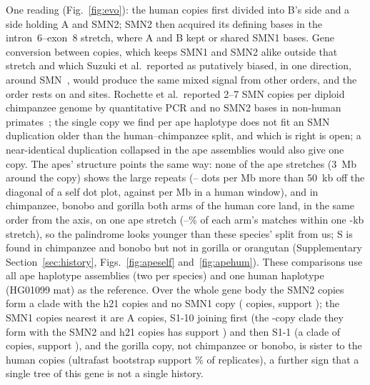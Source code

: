 \documentclass[10pt]{article}
\begin{document}
One reading (Fig.~\ref{fig:evo}): the human copies first divided into B's side and a side
holding A and SMN2; SMN2 then acquired its defining bases in the intron~6--exon~8 stretch, where A and B kept or
shared SMN1 bases. Gene conversion between copies, which keeps SMN1 and SMN2 alike outside that stretch and which Suzuki et al.\ reported as putatively biased, in one direction, around SMN~\cite{suzuki2026}, would produce the same mixed signal from other orders,
and the order rests on \evS{} and \evAB{} sites. Rochette et al.\ reported 2--7 SMN copies per diploid chimpanzee genome
by quantitative PCR and no SMN2 bases in non-human primates~\cite{rochette2001}; the single copy we find per ape
haplotype does not fit an SMN duplication older than the human--chimpanzee split, and which is right is open; a near-identical duplication collapsed in the ape assemblies would also give one copy.
The apes' structure points the same way: none of the \apeHaps{} ape stretches (3~Mb around the copy) shows the large
repeats (\apFarLo--\apFarHi{} dots per Mb more than 50~kb off the diagonal of a self dot plot, against \apFarHum{} per Mb in a human window),
and in chimpanzee, bonobo and gorilla both arms of the human core land, in the same order from the axis, on one ape stretch
(\apShareLo--\apShareHi\% of each arm's matches within one \apWin-kb stretch), so the palindrome looks younger than these
species' split from us; S is found in chimpanzee and bonobo but not in gorilla or orangutan (Supplementary
Section~\ref{sec:history}, Figs.~\ref{fig:apeself} and~\ref{fig:apehum}). These comparisons use all \apeHaps{} ape haplotype assemblies (two per species) and one
human haplotype (HG01099 mat) as the reference. Over the
whole gene body the SMN2 copies form a clade with the \mlSTwoPH{} h21 copies and no SMN1 copy (\mlSTwoMrca{} copies, support \mlSTwoMrcaSup); the SMN1 copies nearest it are A copies, \mlSTwoTen{} S1-10 joining first (the \mlSTwoCopies-copy clade they form with the SMN2 and h21 copies has support \mlSTwoSup) and then \mlSTwoPOne{} S1-1 (a clade of \mlSTwoPCopies{} copies, support \mlSTwoPSup), and the
gorilla copy, not chimpanzee or bonobo, is sister to the human copies (ultrafast bootstrap support \mlGorSup\% of \iqBoot{} replicates), a further sign that a
single tree of this gene is not a single history.
\end{document}
